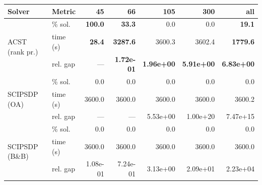 \begin{tabular}{llrrrrr}
\toprule
 Solver & Metric & 45 & 66 & 105 & 300 & all \\
\midrule
\multirow{3}{*}{ACST (rank pr.)} & \% sol. & \textbf{100.0} & \textbf{33.3} & 0.0 & 0.0 & \textbf{19.1} \\
  & time (s) & \textbf{28.4} & \textbf{3287.6} & 3600.3 & 3602.4 & \textbf{1779.6} \\
  & rel. gap & --- & \textbf{1.72e-01} & \textbf{1.96e+00} & \textbf{5.91e+00} & \textbf{6.83e+00} \\
\midrule
\multirow{3}{*}{SCIPSDP (OA)} & \% sol. & 0.0 & 0.0 & 0.0 & 0.0 & 0.0 \\
  & time (s) & 3600.0 & 3600.0 & 3600.0 & 3600.0 & 3600.2 \\
  & rel. gap & --- & --- & 5.53e+00 & 1.00e+20 & 7.47e+15 \\
\midrule
\multirow{3}{*}{SCIPSDP (B\&B)} & \% sol. & 0.0 & 0.0 & 0.0 & 0.0 & 0.0 \\
  & time (s) & 3600.0 & 3600.0 & 3600.0 & 3600.0 & 3600.0 \\
  & rel. gap & 1.08e-01 & 7.24e-01 & 3.13e+00 & 2.09e+01 & 2.23e+04 \\
\bottomrule
\end{tabular}
